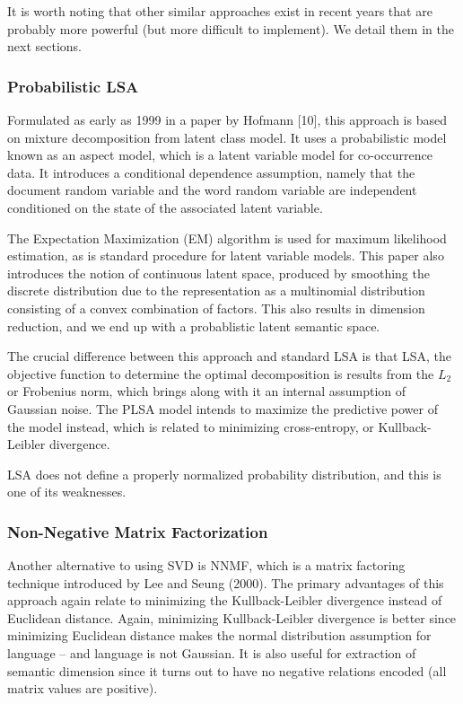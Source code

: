 \documentclass[10pt, letterpaper]{article}
\begin{document}
	It is worth noting that other similar approaches exist in recent years that are probably more powerful (but more difficult to implement). We detail them in the next sections. 

	\subsubsection{Probabilistic LSA}
	Formulated as early as 1999 in a paper by Hofmann [10], this approach is based on mixture decomposition from latent class model. It uses a probabilistic model known as an aspect model, which is a latent variable model for co-occurrence data. It introduces a conditional dependence assumption, namely that the document random variable and the word random variable are independent conditioned on the state of the associated latent variable. 
	
	The Expectation Maximization (EM) algorithm is used for maximum likelihood estimation, as is standard procedure for latent variable models. This paper also introduces the notion of continuous latent space, produced by smoothing the discrete distribution due to the representation as a multinomial distribution
	consisting of a convex combination of factors. This also results in dimension reduction, and we end up with a probablistic latent semantic space. 

	The crucial difference between this approach and standard LSA is that LSA, the objective function to determine the optimal decomposition is results from the $L_2$ or Frobenius norm, which brings along with it an internal assumption of Gaussian noise. The PLSA model intends to maximize the predictive power of the model instead, which is related to minimizing cross-entropy, or Kullback-Leibler divergence. 

	LSA does not define a properly normalized probability distribution, and this is one of its weaknesses.

	\subsubsection{Non-Negative Matrix Factorization}
	Another alternative to using SVD is NNMF, which is a matrix factoring technique introduced by Lee and Seung  (2000). 
	The primary advantages of this approach again relate to minimizing the Kullback-Leibler divergence instead of Euclidean distance. 
	Again, minimizing Kullback-Leibler divergence is better since minimizing Euclidean distance makes the normal distribution assumption for language -- and language is not Gaussian.
	It is also useful for extraction of semantic dimension since it turns out to have no negative relations encoded (all matrix values are positive). 
\end{document}
